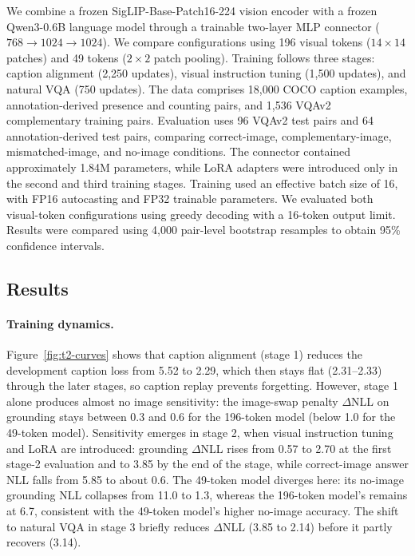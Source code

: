 \documentclass{article}
\begin{document}
We combine a frozen SigLIP-Base-Patch16-224 vision encoder with a frozen Qwen3-0.6B language model through a trainable two-layer MLP connector ($768 \rightarrow 1024 \rightarrow 1024$). We compare configurations using 196 visual tokens ($14\times14$ patches) and 49 tokens ($2\times2$ patch pooling). Training follows three stages: caption alignment (2,250 updates), visual instruction tuning (1,500 updates), and natural VQA (750 updates). The data comprises 18,000 COCO caption examples, annotation-derived presence and counting pairs, and 1,536 VQAv2 complementary training pairs. Evaluation uses 96 VQAv2 test pairs and 64 annotation-derived test pairs, comparing correct-image, complementary-image, mismatched-image, and no-image conditions. The connector contained approximately 1.84M parameters, while LoRA adapters were introduced only in the second and third training stages. Training used an effective batch size of 16, with FP16 autocasting and FP32 trainable parameters. We evaluated both visual-token configurations using greedy decoding with a 16-token output limit. Results were compared using 4,000 pair-level bootstrap resamples to obtain 95\% confidence intervals.

\subsection{Results}
\label{sec:vlm-results}

\paragraph{Training dynamics.}
Figure~\ref{fig:t2-curves} shows that caption alignment (stage 1) reduces the development caption loss from 5.52 to 2.29, which then stays flat (2.31--2.33) through the later stages, so caption replay prevents forgetting. However, stage 1 alone produces almost no image sensitivity: the image-swap penalty $\Delta$NLL on grounding stays between 0.3 and 0.6 for the 196-token model (below 1.0 for the 49-token model). Sensitivity emerges in stage 2, when visual instruction tuning and LoRA are introduced: grounding $\Delta$NLL rises from 0.57 to 2.70 at the first stage-2 evaluation and to 3.85 by the end of the stage, while correct-image answer NLL falls from 5.85 to about 0.6. The 49-token model diverges here: its no-image grounding NLL collapses from 11.0 to 1.3, whereas the 196-token model's remains at 6.7, consistent with the 49-token model's higher no-image accuracy. The shift to natural VQA in stage 3 briefly reduces $\Delta$NLL (3.85 to 2.14) before it partly recovers (3.14).
\end{document}
